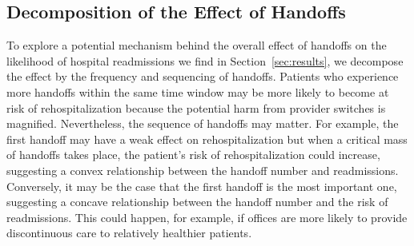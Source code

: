 \documentclass[final,12pt, notitlepage]{article}
\begin{document}
\subsection{Decomposition of the Effect of Handoffs} \label{sec:mechanism}

To explore a potential mechanism behind the overall effect of handoffs on the likelihood of hospital readmissions we find in Section~\ref{sec:results}, we decompose the effect by the frequency and sequencing of handoffs.
Patients who experience more handoffs within the same time window may be more likely to become at risk of rehospitalization because the potential harm from provider switches is magnified.
Nevertheless, the sequence of handoffs may matter.
For example, the first handoff may have a weak effect on rehospitalization but when a critical mass of handoffs takes place, the patient's risk of rehospitalization could increase, suggesting a convex relationship between the handoff number and readmissions.
Conversely, it may be the case that the first handoff is the most important one, suggesting a concave relationship between the handoff number and the risk of readmissions. This could happen, for example, if offices are more likely to provide discontinuous care to relatively healthier patients.

\end{document}
